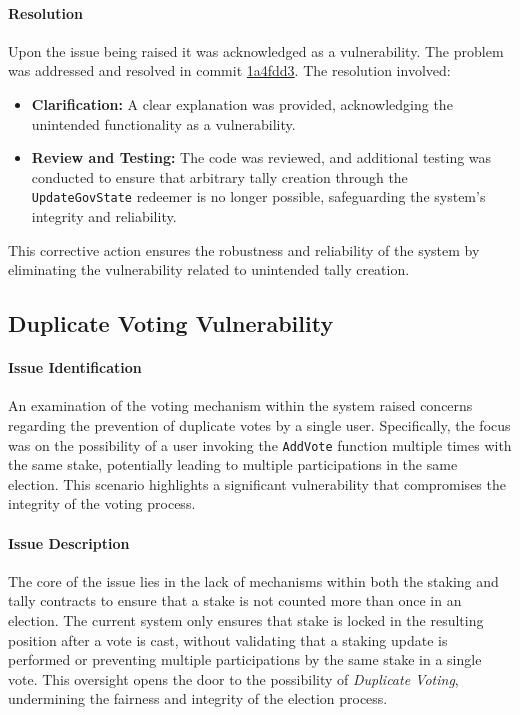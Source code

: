 \documentclass[11pt]{article}
\begin{document}
\paragraph{Resolution}
Upon the issue being raised it was acknowledged as a vulnerability.
The problem was addressed and resolved in commit \href{https://github.com/MuesliSwapTeam/muesliswap-atala-onchain-governance/commit/1a4fdd35a69a374dee71f0192c61de08be7b9602}{1a4fdd3}. The resolution involved:
\begin{itemize}
    \item \textbf{Clarification:} A clear explanation was provided, acknowledging the unintended functionality as a vulnerability.
    \item \textbf{Review and Testing:} The code was reviewed, and additional testing was conducted to ensure that arbitrary tally creation through the \texttt{UpdateGovState} redeemer is no longer possible, safeguarding the system's integrity and reliability.
\end{itemize}
This corrective action ensures the robustness and reliability of the system by eliminating the vulnerability related to unintended tally creation.

\subsection{Duplicate Voting Vulnerability}

\paragraph{Issue Identification}
An examination of the voting mechanism within the system raised concerns regarding the prevention of duplicate votes by a single user.
Specifically, the focus was on the possibility of a user invoking the \texttt{AddVote} function multiple times with the same stake, potentially leading to multiple participations in the same election.
This scenario highlights a significant vulnerability that compromises the integrity of the voting process.

\paragraph{Issue Description}
The core of the issue lies in the lack of mechanisms within both the staking and tally contracts to ensure that a stake is not counted more than once in an election.
The current system only ensures that stake is locked in the resulting position after a vote is cast, without validating that a staking update is performed or preventing multiple participations by the same stake in a single vote.
This oversight opens the door to the possibility of \textit{Duplicate Voting}, undermining the fairness and integrity of the election process.
\end{document}
